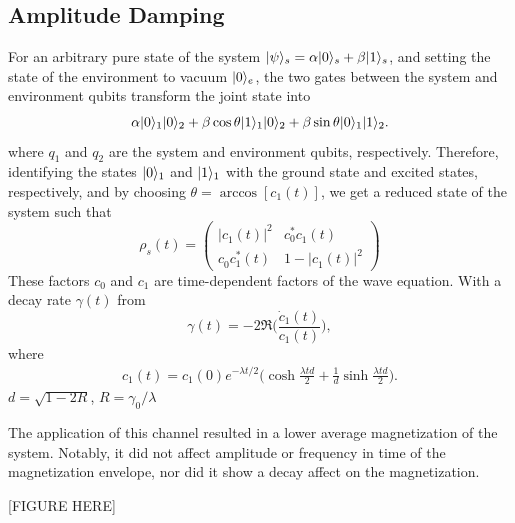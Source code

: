 \documentclass[12pt, twocolumn]{article}
\newcommand*{\eu}{e}
\DeclarePairedDelimiter{\ket}{\lvert}{\rangle}
\begin{document}
  \subsection{Amplitude Damping}
  For an arbitrary pure state of the system \( \ket{\psi}_{s} = \alpha \ket{0}_{s} + \beta \ket{1}_{s} \), and setting the state of the environment to vacuum \( \ket{0}_{e} \), the two gates between the system and environment qubits transform the joint state into
  \begin{equation}
    \alpha \ket{0}_{1} \ket{0}_{2} + \beta \cos \theta \ket{1}_{1} \ket{0}_{2}
    + \beta \sin \theta \ket{0}_{1} \ket{1}_{2}.
  \end{equation}
  where \( q_{1} \) and \( q_{2} \) are the system and environment qubits, respectively. Therefore, identifying the states \( \ket{0}_{1} \) and \( \ket{1}_{1} \) with the ground state and excited states, respectively, and by choosing \( \theta = \arccos[c_{1}(t)] \), we get a reduced state of the system such that
  \begin{equation}
    \rho_{s}(t)
      = \begin{pmatrix}
          \lvert c_{1}^{}(t) \rvert^{2} & c_{0}^{*} c_{1}^{}(t)             \\
          c_{0}^{} c_{1}^{*}(t)         & 1 - \lvert c_{1}^{}(t) \rvert^{2}
        \end{pmatrix}
  \end{equation}
  These factors \( c_{0} \) and \( c_{1} \) are time-dependent factors of the wave equation. With a decay rate \( \gamma(t) \) from
  \begin{equation}
    \gamma(t) = -2 \Re \biggl( \frac{\dot{c}_{1}(t)}{c_{1}(t)} \biggr),
  \end{equation}
  where
  \begin{align}
    c_{1}(t)
      = c_{1}(0) \eu^{-\lambda t / 2}
        \biggl(
          \cosh \frac{\lambda t d}{2}
            + \frac{1}{d}
              \sinh \frac{\lambda t d}{2}
        \biggr).
  \end{align}
  \( d = \sqrt{1 - 2 R} \), \( R = \gamma_{0} / \lambda \)

  The application of this channel resulted in a lower average magnetization of the system. Notably, it did not affect amplitude or frequency in time of the magnetization envelope, nor did it show a decay affect on the magnetization.

  [FIGURE HERE]
\end{document}
